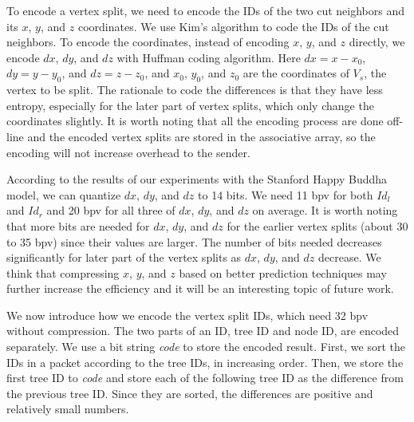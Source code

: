 	To encode a vertex split, we need to encode the IDs of the two
	cut neighbors and its $x$, $y$, and $z$ coordinates.
	We use Kim's algorithm \cite{multiresolution:kim} to code
	the IDs of the cut neighbors.
    To encode the coordinates, instead of encoding $x$, $y$, and $z$ directly, we encode $dx$, $dy$, and $dz$ with
    Huffman coding algorithm. Here $dx = x - x_0$, $dy = y - y_0$,
    and $dz = z - z_0$, and $x_0$, $y_0$, and $z_0$ are the coordinates of
    $V_s$, the vertex to be split. 
    The rationale to code the differences is that they have less entropy, especially
    for the later part of vertex splits, which only change the coordinates slightly.
    It is worth noting that all the encoding process are done off-line and the 
    encoded vertex splits are stored in the associative array, so the encoding will
    not increase overhead to the sender.

    According to the results of our experiments with the Stanford Happy Buddha model,
    we can quantize $dx$, $dy$, and $dz$ to 14 bits. 
    We need 11 bpv for both $Id_l$ and $Id_r$ 
    and 20 bpv for all three of $dx$, $dy$, and $dz$ on average.
    It is worth noting that more bits are needed for $dx$, $dy$, and $dz$ 
    for the earlier vertex splits (about 30 to 35 bpv)
    since their values are larger. 
    The number of bits needed decreases significantly for later part of the vertex splits
    as $dx$, $dy$, and $dz$ decrease. We think that compressing $x$, $y$, and $z$ 
    based on better prediction techniques may further increase the 
    efficiency and it will be an interesting topic of future work.

    We now introduce how we encode the vertex split IDs, 
    which need 32 bpv without compression.  
    The two parts of an ID, tree ID and node ID, are encoded separately.  We use a bit string \textit{code} to store the encoded result.
    First, we sort the IDs in a packet according to the tree IDs, in increasing order. 
    Then, we store the first tree ID to \textit{code} and 
    store each of the following tree ID as the difference from the previous tree ID.
    Since they are sorted, the differences are positive and relatively small numbers.

